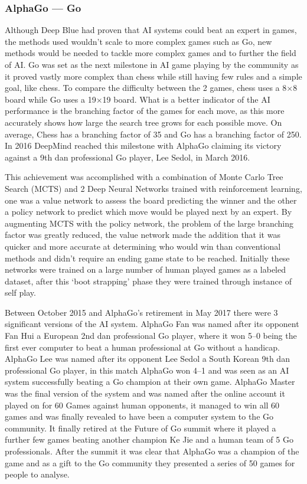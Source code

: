 \documentclass[a4paper]{article}
\begin{document}
\subsubsection{AlphaGo --- Go}
Although Deep Blue had proven that AI systems could beat an expert in games, the methods used wouldn't scale to more complex games such as Go, new methods would be needed to tackle more complex games and to further the field of AI\@.
Go was set as the next milestone in AI game playing by the community as it proved vastly more complex than chess while still having few rules and a simple goal, like chess.
To compare the difficulty between the 2 games, chess uses a 8\(\times \)8 board while Go uses a 19\(\times \)19 board.
What is a better indicator of the AI performance is the branching factor of the games for each move, as this more accurately shows how large the search tree grows for each possible move.
On average, Chess has a branching factor of 35 and Go has a branching factor of 250\cite{BranchingFactor}.
In 2016 DeepMind reached this milestone with AlphaGo claiming its victory against a 9th dan professional Go player, Lee Sedol, in March 2016\cite{alphaGo}.
\par
This achievement was accomplished with a combination of Monte Carlo Tree Search (MCTS) and 2 Deep Neural Networks trained with reinforcement learning, one was a value network to assess the board predicting the winner and the other a policy network to predict which move would be played next by an expert.
By augmenting MCTS with the policy network, the problem of the large branching factor was greatly reduced, the value network made the addition that it was quicker and more accurate at determining who would win than conventional methods and didn't require an ending game state to be reached.
Initially these networks were trained on a large number of human played games as a labeled dataset, after this `boot strapping' phase they were trained through instance of self play.
\par
Between October 2015 and AlphaGo's retirement in May 2017 there were 3 significant versions of the AI system.
AlphaGo Fan was named after its opponent Fan Hui a European 2nd dan professional Go player, where it won 5--0 being the first ever computer to beat a human professional at Go without a handicap.
AlphaGo Lee was named after its opponent Lee Sedol a South Korean 9th dan professional Go player, in this match AlphaGo won 4--1 and was seen as an AI system successfully beating a Go champion at their own game.
AlphaGo Master was the final version of the system and was named after the online account it played on for 60 Games against human opponents, it managed to win all 60 games and was finally revealed to have been a computer system to the Go community.
It finally retired at the Future of Go summit where it played a further few games beating another champion Ke Jie and a human team of 5 Go professionals.
After the summit it was clear that AlphaGo was a champion of the game and as a gift to the Go community they presented a series of 50 games for people to analyse.
\end{document}
